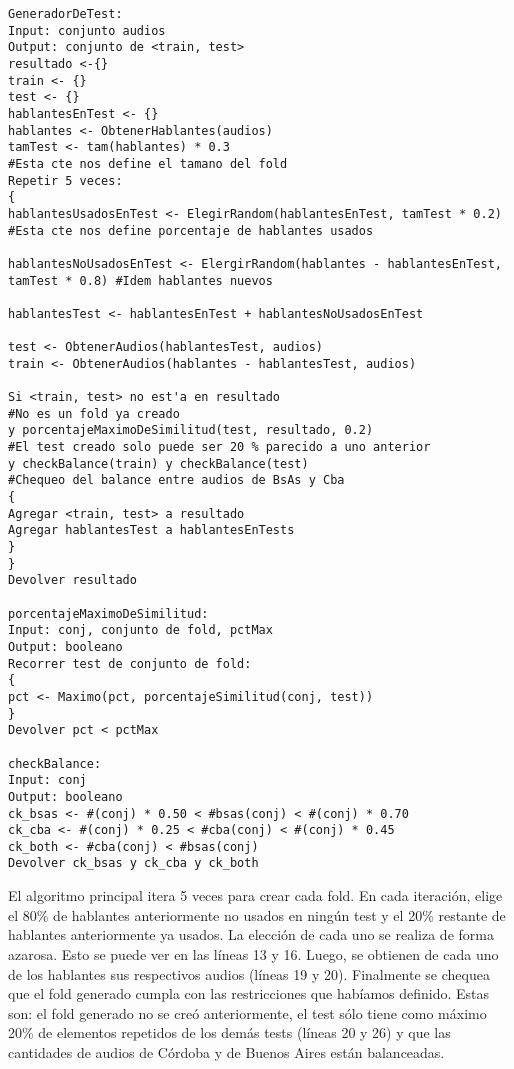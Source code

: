 \begin{lstlisting}
GeneradorDeTest:
Input: conjunto audios
Output: conjunto de <train, test>
resultado <-{}
train <- {}
test <- {}
hablantesEnTest <- {}
hablantes <- ObtenerHablantes(audios)
tamTest <- tam(hablantes) * 0.3 
#Esta cte nos define el tamano del fold
Repetir 5 veces:
{
hablantesUsadosEnTest <- ElegirRandom(hablantesEnTest, tamTest * 0.2) 
#Esta cte nos define porcentaje de hablantes usados

hablantesNoUsadosEnTest <- ElergirRandom(hablantes - hablantesEnTest, tamTest * 0.8) #Idem hablantes nuevos

hablantesTest <- hablantesEnTest + hablantesNoUsadosEnTest

test <- ObtenerAudios(hablantesTest, audios)
train <- ObtenerAudios(hablantes - hablantesTest, audios)

Si <train, test> no est'a en resultado 
#No es un fold ya creado
y porcentajeMaximoDeSimilitud(test, resultado, 0.2) 
#El test creado solo puede ser 20 % parecido a uno anterior
y checkBalance(train) y checkBalance(test) 
#Chequeo del balance entre audios de BsAs y Cba
{
Agregar <train, test> a resultado
Agregar hablantesTest a hablantesEnTests
}
}
Devolver resultado

porcentajeMaximoDeSimilitud:
Input: conj, conjunto de fold, pctMax
Output: booleano
Recorrer test de conjunto de fold:
{
pct <- Maximo(pct, porcentajeSimilitud(conj, test))
}
Devolver pct < pctMax

checkBalance:
Input: conj
Output: booleano
ck_bsas <- #(conj) * 0.50 < #bsas(conj) < #(conj) * 0.70
ck_cba <- #(conj) * 0.25 < #cba(conj) < #(conj) * 0.45
ck_both <- #cba(conj) < #bsas(conj)
Devolver ck_bsas y ck_cba y ck_both
\end{lstlisting}

El algoritmo principal itera 5 veces para crear cada fold. En cada iteración, elige el 80\% de hablantes anteriormente no usados en ningún test y el 20\% restante de hablantes anteriormente ya usados. La elección de cada uno se realiza de forma azarosa. Esto se puede ver en las líneas 13 y 16. Luego, se obtienen de cada uno de los hablantes sus respectivos audios (líneas 19 y 20). Finalmente se chequea que el fold generado cumpla con las restricciones que habíamos definido. Estas son: el fold generado no se creó anteriormente, el test sólo tiene como máximo 20\% de elementos repetidos de los demás tests (líneas 20 y 26) y que las cantidades de audios de Córdoba y de Buenos Aires están balanceadas.

